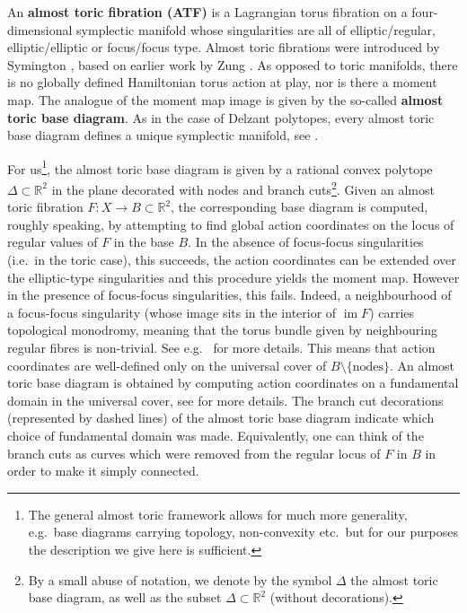 \documentclass[12pt,a4paper,draft]{scrartcl}
\DeclareMathOperator{\im}{im}
\begin{document}
An \textbf{almost toric fibration (ATF)} is a Lagrangian torus fibration on a four-dimensional symplectic manifold whose singularities are all of elliptic\-/regular, elliptic\-/elliptic or focus\-/focus type.
Almost toric fibrations were introduced by Sy\-ming\-ton \cite{symington2002FourDF}, based on earlier work by Zung \cite{Zun96,Zun97,Zun03}. As opposed to toric manifolds, there is no globally defined Hamiltonian torus action at play, nor is there a moment map.
The analogue of the moment map image is given by the so-called \textbf{almost toric base diagram}. As in the case of Delzant polytopes, every almost toric base diagram defines a unique symplectic manifold, see \cite[Corollary 5.4]{symington2002FourDF} \cite[Theorem 8.5]{evans2021atfs}. 

For us\footnote{The general almost toric framework allows for much more generality, e.g.\ base diagrams carrying topology, non-convexity etc.\ but for our purposes the description we give here is sufficient.}, the almost toric base diagram is given by a rational convex polytope $\Delta \subset \mathbb{R}^2$ in the plane decorated with nodes and branch cuts\footnote{By a small abuse of notation, we denote by the symbol $\Delta$ the almost toric base diagram, as well as the subset $\Delta \subset \mathbb{R}^2$ (without decorations).}.
Given an almost toric fibration $F \colon X \rightarrow B \subset \mathbb{R}^2$, the corresponding base diagram is computed, roughly speaking, by attempting to find global action coordinates on the locus of regular values of $F$ in the base $B$.
In the absence of focus-focus singularities (i.e.\ in the toric case), this succeeds, the action coordinates can be extended over the elliptic-type singularities and this procedure yields the moment map.
However in the presence of focus-focus singularities, this fails.
Indeed, a neighbourhood of a focus-focus singularity (whose image sits in the interior of $\im F$) carries topological monodromy, meaning that the torus bundle given by neighbouring regular fibres is non-trivial.
See e.g.\ \cite{Zun97} for more details.
This means that action coordinates are well-defined only on the universal cover of $B \setminus \{\text{nodes}\}$. An almost toric base diagram is obtained by computing action coordinates on a fundamental domain in the universal cover, see \cite[Definition 8.3]{evans2021atfs} for more details.
The branch cut decorations (represented by dashed lines) of the almost toric base diagram indicate which choice of fundamental domain was made.
Equivalently, one can think of the branch cuts as curves which were removed from the regular locus of $F$ in $B$ in order to make it simply connected.
\end{document}
